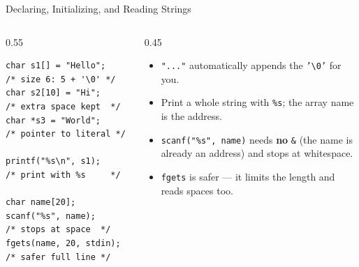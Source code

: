 \documentclass[aspectratio=169]{beamer}
\begin{document}
	\begin{frame}[fragile]{Declaring, Initializing, and Reading Strings}
		\begin{columns}[T]
			\begin{column}{0.55\textwidth}
				\begin{lstlisting}
char s1[] = "Hello";   /* size 6: 5 + '\0' */
char s2[10] = "Hi";    /* extra space kept  */
char *s3 = "World";    /* pointer to literal */

printf("%s\n", s1);    /* print with %s     */

char name[20];
scanf("%s", name);        /* stops at space  */
fgets(name, 20, stdin);   /* safer full line */
				\end{lstlisting}
			\end{column}
			\begin{column}{0.45\textwidth}
				\begin{itemize}\small
					\item \texttt{"..."} automatically appends the \texttt{'\textbackslash 0'} for you.
					\item Print a whole string with \texttt{\%s}; the array name is the address.
					\item \texttt{scanf("\%s", name)} needs \textbf{no} \texttt{\&} (the name is already an address) and stops at whitespace.
					\item \texttt{fgets} is safer --- it limits the length and reads spaces too.
				\end{itemize}
			\end{column}
		\end{columns}
	\end{frame}

\end{document}
